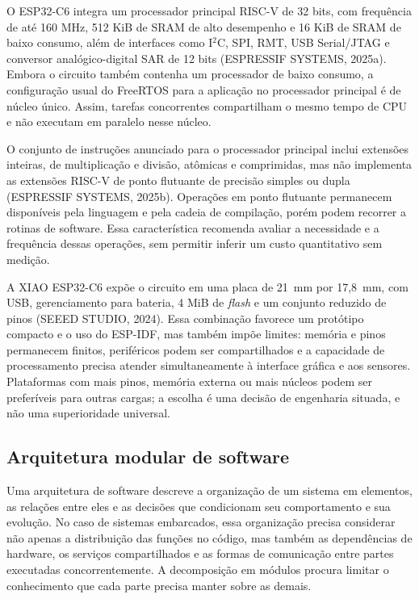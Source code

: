 \documentclass{article}
\begin{document}
O ESP32-C6 integra um processador principal RISC-V de 32 bits, com frequ\^encia de at\'e 160 MHz, 512 KiB de SRAM de alto desempenho e 16 KiB de SRAM de baixo consumo, al\'em de interfaces como I$^2$C, SPI, RMT, USB Serial/JTAG e conversor anal\'ogico-digital SAR de 12 bits (ESPRESSIF SYSTEMS, 2025a). Embora o circuito tamb\'em contenha um processador de baixo consumo, a configura\c{c}\~ao usual do FreeRTOS para a aplica\c{c}\~ao no processador principal \'e de n\'ucleo \'unico. Assim, tarefas concorrentes compartilham o mesmo tempo de CPU e n\~ao executam em paralelo nesse n\'ucleo.


O conjunto de instru\c{c}\~oes anunciado para o processador principal inclui extens\~oes inteiras, de multiplica\c{c}\~ao e divis\~ao, at\^omicas e comprimidas, mas n\~ao implementa as extens\~oes RISC-V de ponto flutuante de precis\~ao simples ou dupla (ESPRESSIF SYSTEMS, 2025b). Opera\c{c}\~oes em ponto flutuante permanecem dispon\'iveis pela linguagem e pela cadeia de compila\c{c}\~ao, por\'em podem recorrer a rotinas de software. Essa caracter\'istica recomenda avaliar a necessidade e a frequ\^encia dessas opera\c{c}\~oes, sem permitir inferir um custo quantitativo sem medi\c{c}\~ao.


A XIAO ESP32-C6 exp\~oe o circuito em uma placa de 21~mm por 17,8~mm, com USB, gerenciamento para bateria, 4 MiB de \emph{flash} e um conjunto reduzido de pinos (SEEED STUDIO, 2024). Essa combina\c{c}\~ao favorece um prot\'otipo compacto e o uso do ESP-IDF, mas tamb\'em imp\~oe limites: mem\'oria e pinos permanecem finitos, perif\'ericos podem ser compartilhados e a capacidade de processamento precisa atender simultaneamente \`a interface gr\'afica e aos sensores. Plataformas com mais pinos, mem\'oria externa ou mais n\'ucleos podem ser prefer\'iveis para outras cargas; a escolha \'e uma decis\~ao de engenharia situada, e n\~ao uma superioridade universal.


\subsection{Arquitetura modular de software}


Uma arquitetura de software descreve a organiza\c{c}\~ao de um sistema em elementos, as rela\c{c}\~oes entre eles e as decis\~oes que condicionam seu comportamento e sua evolu\c{c}\~ao. No caso de sistemas embarcados, essa organiza\c{c}\~ao precisa considerar n\~ao apenas a distribui\c{c}\~ao das fun\c{c}\~oes no c\'odigo, mas tamb\'em as depend\^encias de hardware, os servi\c{c}os compartilhados e as formas de comunica\c{c}\~ao entre partes executadas concorrentemente. A decomposi\c{c}\~ao em m\'odulos procura limitar o conhecimento que cada parte precisa manter sobre as demais.
\end{document}
